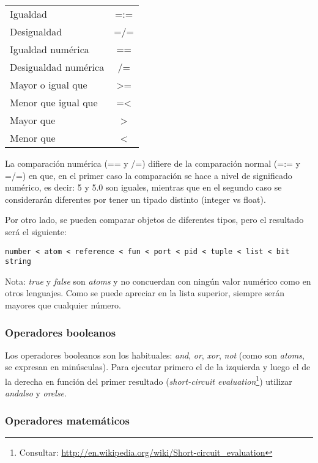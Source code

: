 \begin{table}[ht]
\centering
\begin{tabular}{|l|c|}
Igualdad             & =:=           \\
Desigualdad          & =/=           \\
Igualdad numérica    & ==            \\
Desigualdad numérica & /=            \\
Mayor o igual que    & \textgreater= \\
Menor que igual que  & =\textless    \\
Mayor que	     & \textgreater  \\
Menor que	     & \textless     \\
\end{tabular}
\end{table}

La comparación numérica (== y /=) difiere de la comparación normal (=:= y =/=) en que, en el primer caso la
comparación se hace a nivel de significado numérico, es decir: 5 y 5.0 son iguales, mientras que en el
segundo caso se considerarán diferentes por tener un tipado distinto (integer vs float).

Por otro lado, se pueden comparar objetos de diferentes tipos, pero el resultado será el siguiente:
\begin{verbatim}
number < atom < reference < fun < port < pid < tuple < list < bit string
\end{verbatim}

Nota: \textit{true} y \textit{false} son \textit{atoms} y no concuerdan con ningún valor numérico como en
otros lenguajes. Como se puede apreciar en la lista superior, siempre serán mayores que cualquier número.

\subsubsection{Operadores booleanos}

Los operadores booleanos son los habituales: \textit{and}, \textit{or}, \textit{xor}, \textit{not} (como
son \textit{atoms}, se expresan en minúsculas). Para ejecutar primero el de la izquierda y luego el de la
derecha en función del primer resultado (\textit{short-circuit evaluation}\footnote{Consultar:
\url{http://en.wikipedia.org/wiki/Short-circuit_evaluation}}) utilizar \textit{andalso} y \textit{orelse}.


\subsubsection{Operadores matemáticos}

